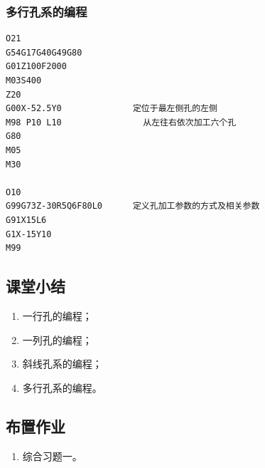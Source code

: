 \subsubsection{多行孔系的编程}
\begin{lstlisting}
O21
G54G17G40G49G80
G01Z100F2000
M03S400
Z20                      
G00X-52.5Y0              定位于最左侧孔的左侧
M98 P10 L10                从左往右依次加工六个孔
G80
M05
M30

O10
G99G73Z-30R5Q6F80L0      定义孔加工参数的方式及相关参数
G91X15L6 
G1X-15Y10
M99
\end{lstlisting}


\subsection{课堂小结}
\begin{enumerate}[1、]
\item 一行孔的编程；
\item 一列孔的编程；
\item 斜线孔系的编程；
\item 多行孔系的编程。
\end{enumerate}

\vfill
\subsection{布置作业}
\begin{enumerate}[1、]
	\item 综合习题一。
\end{enumerate}
\vfill